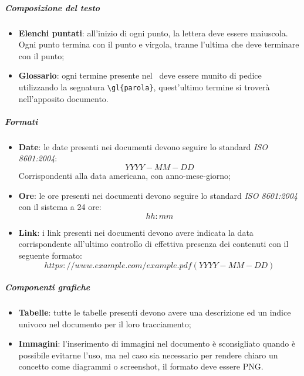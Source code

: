 \documentclass[../NormeDiProgetto_v3.0.0.tex]{subfiles}
\begin{document}
				\subparagraph{Composizione del testo}
				\begin{itemize}
				\item \textbf{Elenchi puntati}: all'inizio di ogni punto, la lettera deve essere maiuscola. Ogni punto termina con il punto e virgola, tranne l'ultima che deve terminare con il punto;
				\item \textbf{Glossario}: ogni termine presente nel \glossario\ deve essere munito di pedice utilizzando la segnatura \verb|\gl{parola}|, quest'ultimo termine si troverà nell'apposito documento.
				\end{itemize}

				\subparagraph{Formati}
				\begin{itemize}
				\item \textbf{Date}: le date presenti nei documenti devono seguire lo standard \textit{ISO 8601:2004}:\\
				\begin{equation*}
					YYYY-MM-DD
				\end{equation*}
				Corrispondenti alla data americana, con anno-mese-giorno;
				\item \textbf{Ore}: le ore presenti nei documenti devono seguire lo standard \textit{ISO 8601:2004}
				con il sistema a 24 ore:\\
					\begin{equation*}
							hh:mm
					\end{equation*}
				\item \textbf{Link}: i link presenti nei documenti devono avere indicata la data corrispondente all'ultimo controllo di effettiva presenza dei contenuti con il seguente formato:\\
				\begin{equation*}
					https://www.example.com/example.pdf(YYYY-MM-DD)
					\end{equation*}
				\end{itemize}

				\subparagraph{Componenti grafiche}
				\begin{itemize}

				\item \textbf{Tabelle}: tutte le tabelle presenti devono avere una descrizione ed un indice univoco nel documento per il loro tracciamento;
				\item \textbf{Immagini}: l'inserimento di immagini nel documento è sconsigliato quando è possibile evitarne l'uso, ma nel caso sia necessario per rendere chiaro un concetto come diagrammi o screenshot, il formato deve essere PNG.
				\end{itemize}
\end{document}
